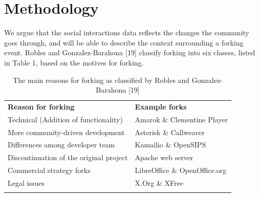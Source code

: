 \documentclass[ifip]{svmult}
\begin{document}
%
%

\section{Methodology}
\label{sec:5}

We argue that the social interactions data reflects the changes the community goes through, and will be able to describe the context surrounding a forking event. Robles and Gonzalez-Barahona [19] classify forking into six classes, listed in Table 1, based on the motives for forking.

\begin{table}
\centering
\caption{The main reasons for forking as classified by Robles and Gonzalez-Barahona [19]}
\label{tab:3}       %
%
%
\begin{tabular}{p{2.5in} p{1.8in}}
\hline\noalign{\smallskip}
\textbf{Reason for forking} & \textbf{Example forks} \\
\noalign{\smallskip}\hline\noalign{\smallskip}
Technical (Addition of functionality) & Amarok \& Clementine Player \\ \hline
More community-driven development & Asterisk \& Callweaver \\ \hline
Differences among developer team & Kamailio \& OpenSIPS \\ \hline
Discontinuation of the original project & Apache web server \\ \hline
Commercial strategy forks & LibreOffice \& OpenOffice.org \\ \hline
Legal issues & X.Org \& XFree \\
\noalign{\smallskip}\hline
\end{tabular}
\end{table}
\end{document}
